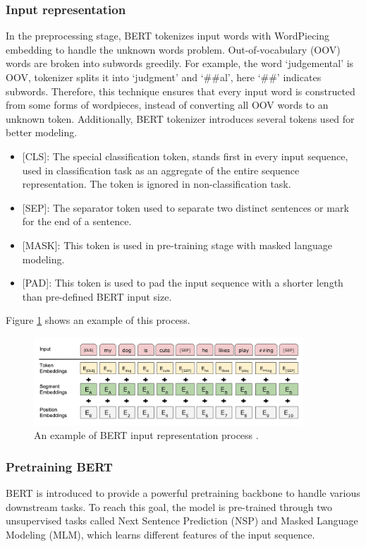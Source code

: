 \subsubsection{Input representation}
In the preprocessing stage, BERT tokenizes input words with WordPiecing embedding \cite{wu2016google} to handle the unknown words problem. Out-of-vocabulary (OOV) words are broken into subwords greedily. For example, the word ‘judgemental’ is OOV, tokenizer splits it into ‘judgment’ and ‘\#\#al’, here ‘\#\#’ indicates subwords. Therefore, this technique ensures that every input word is constructed from some forms of wordpieces, instead of converting all OOV words to an unknown token.
Additionally, BERT tokenizer introduces several tokens used for better modeling.
\begin{itemize}
    \item {[CLS]}: The special classification token, stands first in every input sequence, used in classification task as an aggregate of the entire sequence representation. The token is ignored in non-classification task.
    \item {[SEP]}: The separator token used to separate two distinct sentences or mark for the end of a sentence.
    \item {[MASK]}: This token is used in pre-training stage with masked language modeling.
    \item {[PAD]}: This token is used to pad the input sequence with a shorter length than pre-defined BERT input size.
\end{itemize}
Figure \ref{fig:BERT_input} shows an example of this process.
\begin{figure}
    \centering
    \includegraphics[width=0.9\textwidth]{resources/images/BERT_input.png}
    \caption{An example of BERT input representation process \cite{devlin2018bert}.}
    \label{fig:BERT_input}
\end{figure}
\subsubsection{Pretraining BERT}
BERT is introduced to provide a powerful pretraining backbone to handle various downstream tasks. To reach this goal, the model is pre-trained through two unsupervised tasks called Next Sentence Prediction (NSP) and Masked Language Modeling (MLM), which learns different features of the input sequence.

